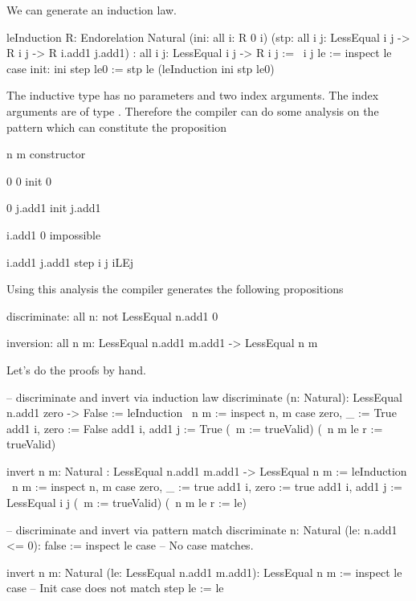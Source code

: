We can generate an induction law.
\begin{alba}
    leInduction
        {R: Endorelation Natural}
        (ini: all {i}: R 0 i)
        (stp: all {i j}: LessEqual i j -> R i j -> R i.add1 j.add1)
        : all {i j}: LessEqual i j -> R i j
    :=
        \ {i j} le :=
            inspect le case
                init: ini
                step le0 := stp le (leInduction ini stp le0)
\end{alba}

The inductive type has no parameters and two index arguments. The index
arguments are of type . Therefore the compiler can do some analysis
on the pattern which can constitute the proposition 

\begin{alba}
        n               m                   constructor

        0               0                   init 0

        0               j.add1              init j.add1

        i.add1          0                   impossible

        i.add1          j.add1              step i j iLEj
\end{alba}
%
Using this analysis the compiler generates the following propositions
\begin{alba}
    discriminate: all n: not LessEqual n.add1 0

    inversion: all n m: LessEqual n.add1 m.add1 -> LessEqual n m
\end{alba}

Let's do the proofs by hand.

\begin{alba}
    -- discriminate and invert via induction law
    discriminate (n: Natural): LessEqual n.add1 zero -> False :=
        leInduction
            {\ n m :=
                inspect n, m case
                    zero, _ :=
                        True
                    add1 i, zero :=
                        False
                    add1 i, add1 j :=
                        True}
            (\ {m} := trueValid)
            (\ {n m} le r := trueValid)


    invert {n m: Natural}
        : LessEqual n.add1 m.add1 -> LessEqual n m
    :=
        leInduction
            {\ n m :=
                inspect n, m case
                    zero, _ :=
                        true
                    add1 i, zero :=
                        true
                    add1 i, add1 j :=
                        LessEqual i j}
            (\ {m} := trueValid)
            (\ {n m} le r := le)


    -- discriminate and invert via pattern match
    discriminate {n: Natural} (le: n.add1 <= 0): false :=
        inspect le case
            -- No case matches.

    invert {n m: Natural} (le: LessEqual n.add1 m.add1): LessEqual n m
    :=
        inspect le case
            -- Init case does not match
            step le := le
\end{alba}



